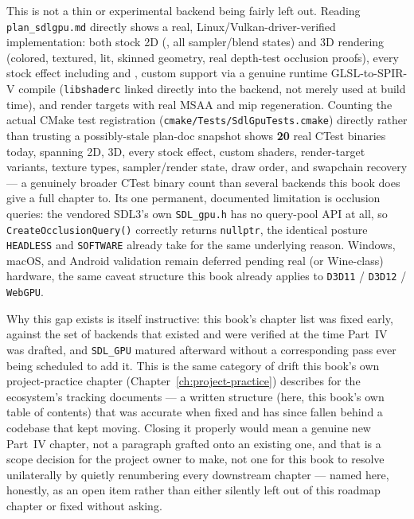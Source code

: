 This is not a thin or experimental backend being fairly left out. Reading \texttt{plan\_sdlgpu.md}
directly shows a real, Linux/Vulkan-driver-verified implementation: both stock 2D
(, all sampler/blend states) and 3D rendering (colored, textured, lit,
skinned geometry, real depth-test occlusion proofs), every stock effect including
 and , custom 
support via a genuine runtime GLSL-to-SPIR-V compile (\texttt{libshaderc} linked directly into
the backend, not merely used at build time), and render targets with real MSAA and mip
regeneration. Counting the actual CMake test registration
(\texttt{cmake/Tests/SdlGpuTests.cmake}) directly rather than trusting a possibly-stale plan-doc
snapshot shows \textbf{20} real CTest binaries today, spanning 2D, 3D, every stock effect,
custom shaders, render-target variants, texture types, sampler/render state, draw order, and
swapchain recovery --- a genuinely broader CTest binary count than several backends this book
does give a full chapter to. Its one permanent, documented limitation is occlusion queries:
the vendored SDL3's own \texttt{SDL\_gpu.h} has no query-pool API at all, so
\texttt{CreateOcclusionQuery()} correctly returns \texttt{nullptr}, the identical posture
\texttt{HEADLESS} and \texttt{SOFTWARE} already take for the same underlying reason. Windows,
macOS, and Android validation remain deferred pending real (or Wine-class) hardware, the same
caveat structure this book already applies to \texttt{D3D11} / \texttt{D3D12} / \texttt{WebGPU}.

Why this gap exists is itself instructive: this book's chapter list was fixed early, against
the set of backends that existed and were verified at the time Part~IV was drafted, and
\texttt{SDL\_GPU} matured afterward without a corresponding pass ever being scheduled to add
it. This is the same category of drift this book's own project-practice chapter
(Chapter~\ref{ch:project-practice}) describes for the ecosystem's tracking documents ---
a written structure (here, this book's own table of contents) that was accurate when fixed and
has since fallen behind a codebase that kept moving. Closing it properly would mean a genuine
new Part~IV chapter, not a paragraph grafted onto an existing one, and that is a scope decision
for the project owner to make, not one for this book to resolve unilaterally by quietly
renumbering every downstream chapter --- named here, honestly, as an open item rather than
either silently left out of this roadmap chapter or fixed without asking.

